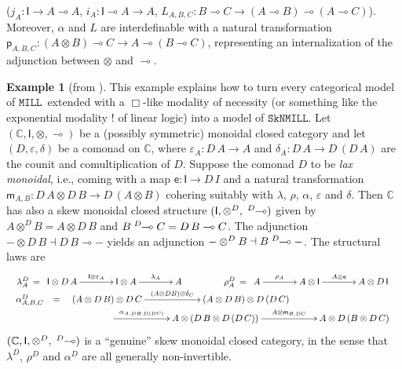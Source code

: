 \documentclass[copyright,creativecommons]{eptcs}
\theoremstyle{definition}
\newtheorem{example}{Example}[section]
\newcommand{\ot}{\otimes}
\newcommand{\lolli}{\multimap}
\newcommand{\I}{\mathsf{I}}
\newcommand{\otd}{\ot^D}
\newcommand{\lollid}{\;\textsuperscript{$D$}\!\!\lolli}
\newcommand{\MILL}{$\mathtt{MILL}$}
\newcommand{\SkNMILL}{$\mathtt{SkNMILL}$}
\begin{document}
($j_A : \I \to A \lolli A$, $i_A : \I \lolli A \to A$, $L_{A,B,C} : B \lolli C \to (A \lolli B) \lolli (A \lolli C)$).
Moreover, $\alpha$ and $L$ are interdefinable with a natural transformation $\mathsf{p}_{A , B , C} : (A \ot B) \lolli C \to A \lolli (B \lolli C)$, representing an internalization of the adjunction between $\ot$ and $\lolli$.
\begin{example}[from \cite{uustalu:eilenberg-kelly:2020}]
This example explains how to turn every categorical model of \MILL\ extended with a $\Box$-like modality of necessity (or something like the exponential modality $!$ of linear logic) into a model of \SkNMILL.
Let $(\mathbb{C},\I,\ot,\lolli)$ be a (possibly symmetric) monoidal closed category and let $(D,\varepsilon, \delta)$ be a comonad on $\mathbb{C}$, where $\varepsilon_A : D\,A \to A$ and $\delta_A : D\,A \to D\,(D\,A)$ are the counit and comultiplication of $D$. Suppose the comonad $D$ to be \emph{lax monoidal}, i.e., coming with a map $\mathsf{e} : \I \to D\,I$ and a natural transformation $\mathsf{m}_{A,B} : D \,A \ot D\,B \to D\,(A \ot B)$ cohering suitably with $\lambda$, $\rho$, $\alpha$, $\varepsilon$ and $\delta$.
Then $\mathbb{C}$ has also a skew monoidal closed structure $(\I, \otd, \lollid)$ given by  $A \otd B = A \ot D\,B$ and $B \lollid C = D\,B \lolli C$. The adjunction ${-} \ot D\,B \dashv D\,B \lolli {-}$ yields an adjunction ${-} \otd B \dashv B \lollid {-}$. The structural laws are
\[
\begin{array}{c}
\lambda^D_A \, = \, \xymatrix@C=3pc{\I \ot D\,A \ar[r]^-{\I \ot \varepsilon_A} & \I \ot A \ar[r]^-{\lambda_A} & A}
\hspace*{1.5cm}
\rho^D_A \, = \, \xymatrix@C=3pc{A \ar[r]^-{\rho_A} & A \ot \I \ar[r]^-{A \ot \mathsf{e}} & A \ot D\,\I}
\\
\begin{array}{rcl}
\alpha^D_{A,B,C} & = & \xymatrix@C=5pc{(A \ot D\,B) \ot D\,C
                   \ar[r]^-{(A \ot D B) \ot \delta_C}
                   & (A \ot D\,B) \ot D\,(D\,C)} \\
& & \hspace*{1.5cm} \xymatrix@C=5pc{\ar[r]^-{\alpha_{A,DB,D(DC)}}
                  & A \ot (D\,B \ot D\,(D\,C)) \ar[r]^-{A \ot \mathsf{m}_{B,DC}}
                  & A \ot D\,(B \ot D\,C)}
\end{array}
\end{array}
\]
$(\mathbb{C},\I,\otd,\lollid)$  is a ``genuine'' skew monoidal closed category, in the sense that $\lambda^D$, $\rho^D$ and $\alpha^D$ are all generally non-invertible.
\end{example}
\end{document}
